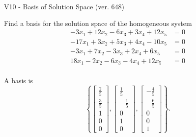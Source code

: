 \begin{exercise}
  \begin{exerciseTitle}V10 - Basis of Solution Space (ver. 648)\end{exerciseTitle}
  \begin{exerciseStatement}
    Find a basis for the solution space of the homogeneous system 
\begin{align*}
 -3 x_ 1 + 12 x_ 2 -6 x_ 3 + 3 x_ 4 + 12 x_ 5 &= 0  \\ 
  -17 x_ 1 + 3 x_ 2 + 5 x_ 3 + 4 x_ 4 -10 x_ 5 &= 0  \\ 
  -3 x_ 1 + 7 x_ 2 -3 x_ 3 + 2 x_ 4 + 6 x_ 5 &= 0  \\ 
  18 x_ 1 -2 x_ 2 -6 x_ 3 -4 x_ 4 + 12 x_ 5 &= 0  \\ 
 \end{align*}


 
  \end{exerciseStatement}

  \begin{exerciseAnswer}
   A basis is   
\[\left\{\left[\begin{array}{c}
\frac{2}{5} \\
\frac{3}{5} \\
1 \\
0 \\
0
\end{array}\right] , \left[\begin{array}{c}
\frac{1}{5} \\
-\frac{1}{5} \\
0 \\
1 \\
0
\end{array}\right] , \left[\begin{array}{c}
-\frac{4}{5} \\
-\frac{6}{5} \\
0 \\
0 \\
1
\end{array}\right]\right\}.\]

  


  \end{exerciseAnswer}
\end{exercise}
